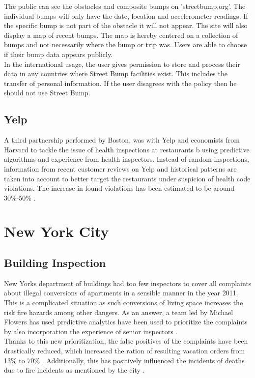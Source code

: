 \documentclass[a4paper,12pt]{report}
\begin{document}
			The public can see the obstacles and composite bumps on 'streetbump.org'. The individual bumps will only have the date, location and accelerometer readings. If the specific bump is not part of the obstacle it will not appear.  The site will also display a map of recent bumps. The map is hereby centered on a collection of bumps and not necessarily where the bump or trip was. Users are able to choose if their bump data appears publicly.\\
			In the international usage, the user gives permission to store and process their data in any countries where Street Bump facilities exist. This includes the transfer of personal information. If the user disagrees with the policy then he should not use Street Bump.
		\closesection	
		\subsection[Yelp]{Yelp \cite{YelpBoston}}
		\startsubsection
			A third partnership performed by Boston, was with Yelp and economists from Harvard to tackle the issue of health inspections at restaurants b using predictive algorithms and experience from health inspectors.
			Instead of random inspections, information from recent customer reviews on Yelp and historical patterns are taken into account to better target the restaurants under suspicion of health code violations. The increase in found violations has been estimated to be around 30\%-50\% \cite{BSL16} \cite{Gla16}.
		\closesection
	\closesection
	
	\section{New York City}
	\startsection
		\subsection{Building Inspection}
		\startsubsection
			New Yorks department of buildings had too few inspectors to cover all complaints about illegal conversions of apartments in a sensible manner in the year 2011. This is a complicated situation as such conversions of living space increases the risk fire hazards among other dangers. As an answer, a team led by Michael Flowers has used predictive analytics have been used to prioritize the complaints by also incorporation the experience of senior inspectors \cite{BeyondOpenData}.\\
			Thanks to this new prioritization, the false positives of the complaints have been drastically reduced, which increased the ration of resulting vacation orders from 13\% to 70\% \cite{PredictiveDataAnalytics}.
			Additionally, this has positively influenced the incidents of deaths due to fire incidents as mentioned by the city \cite{BigDataBigApple} \cite{FDNY}.
		\closesection
\end{document}
